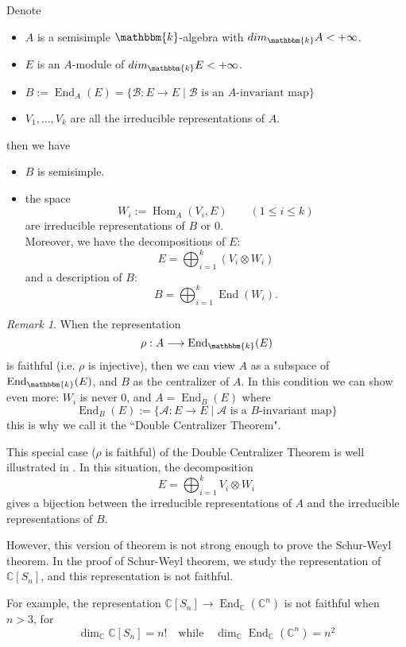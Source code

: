 \documentclass[11pt,oneside]{amsart}
\numberwithin{equation}{section}
\theoremstyle{plain}
\theoremstyle{plain}
\numberwithin{equation}{section}
\theoremstyle{remark}
\newtheorem{remark}[theorem]{Remark}
\newcommand{\elli}{,\ldots,}
\newcommand{\Hom}{\operatorname{Hom}}
\newcommand{\End}{\operatorname{End}}
\begin{document}
	Denote
	\begin{itemize}
		\item $A$ is a semisimple $\mathbbm{k}$-algebra with $dim_{\mathbbm{k}}A < + \infty$.
		\item $E$ is an $A$-module of $dim_{\mathbbm{k}}E < + \infty$.
		\item $B:=\End_A(E)=\{\mathcal{B}:E\longrightarrow E \mid \mathcal{B} \text{ is an $A$-invariant map}\}$
		\item $V_1 \elli V_k$ are all the irreducible representations of $A$. 
	\end{itemize}
then we have
\begin{itemize}
	\item $B$ is semisimple.
	\item the space
	$$W_i:=\Hom_A (V_i,E) \qquad (1\leqslant i \leqslant k)$$ 
	are irreducible representations of $B$ or 0.\\
	Moreover, we have the decompositions of $E$:
	$$E = \bigoplus_{i=1}^k (V_i \otimes W_i)$$
	and a description of $B$:
	$$B=\bigoplus_{i=1}^k \End(W_i).$$
\end{itemize}
	\begin{remark}
		When the representation
		$$\rho:A\longrightarrow \End_{\mathbbm{k}}(E)$$
		is faithful (i.e. $\rho$ is injective), then we can view $A$ as a subspace of $\End_{\mathbbm{k}}(E)$, and $B$ as the centralizer of $A$. In this condition we can show even more: $W_i$ is never 0, and $A=\End_B(E)$ where
		$$\End_B(E):=\{\mathcal{A}:E\longrightarrow E \mid \mathcal{A} \text{ is a $B$-invariant map}\}$$
		this is why we call it the ``Double Centralizer Theorem".
		
		This special case ($\rho$ is faithful) of the Double Centralizer Theorem is well illustrated in \cite[6]{SWduality}. In this situation, the decomposition
		$$E = \bigoplus_{i=1}^k V_i \otimes W_i$$
		gives a bijection between the irreducible representations of $A$ and the irreducible representations of $B$.
		
		However, this version of theorem is not strong enough to prove the Schur-Weyl theorem. In the proof of Schur-Weyl theorem, we study the representation of $\mathbb{C}[S_n]$, and this representation is not faithful.
		
		 For example, the representation $\mathbb{C}[S_n]\longrightarrow \End_{\mathbb{C}}(\mathbb{C}^n)$ is not faithful when $n>3$, for
		$$\dim_{\mathbb{C}}\mathbb{C}[S_n]=n! \quad \text{while} \quad \dim_{\mathbb{C}}\End_{\mathbb{C}}(\mathbb{C}^n) =n^2$$
	\end{remark}
\end{document}
